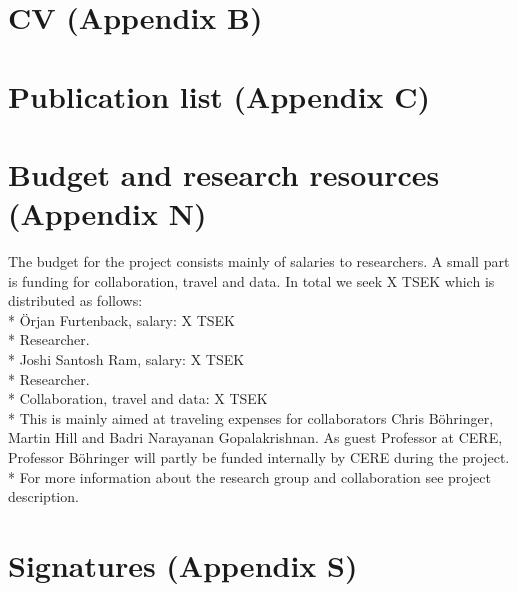 \documentclass[10pt,a4paper]{article}
\begin{document}
\section{CV (Appendix B)}
\section{Publication list (Appendix C)}
\section{Budget and research resources (Appendix N)}
The budget for the project consists mainly of salaries to researchers. A small part is funding 
for collaboration, travel and data. In total we seek X TSEK which is distributed as follows:\\*
Örjan Furtenback, salary: X TSEK\\*
Researcher.\\*
Joshi Santosh Ram, salary: X TSEK\\*
Researcher.\\*
Collaboration, travel and data: X TSEK\\*
This is mainly aimed at traveling expenses for collaborators Chris Böhringer, Martin Hill and Badri Narayanan Gopalakrishnan. As guest Professor at CERE, Professor Böhringer will partly be funded internally 
by CERE during the project.\\*
For more information about the research group and collaboration see project description. 
\section{Signatures (Appendix S)}



\pagebreak
{}


\end{document}
